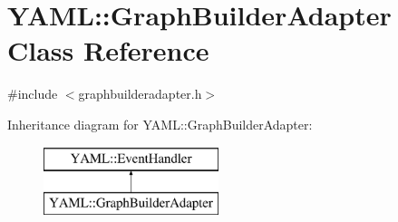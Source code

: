\hypertarget{class_y_a_m_l_1_1_graph_builder_adapter}{}\section{Y\+A\+ML\+::Graph\+Builder\+Adapter Class Reference}
\label{class_y_a_m_l_1_1_graph_builder_adapter}


{\ttfamily \#include $<$graphbuilderadapter.\+h$>$}

Inheritance diagram for Y\+A\+ML\+::Graph\+Builder\+Adapter\+:\begin{figure}[H]
\begin{center}
\leavevmode
\includegraphics[height=2.000000cm]{class_y_a_m_l_1_1_graph_builder_adapter}
\end{center}
\end{figure}
